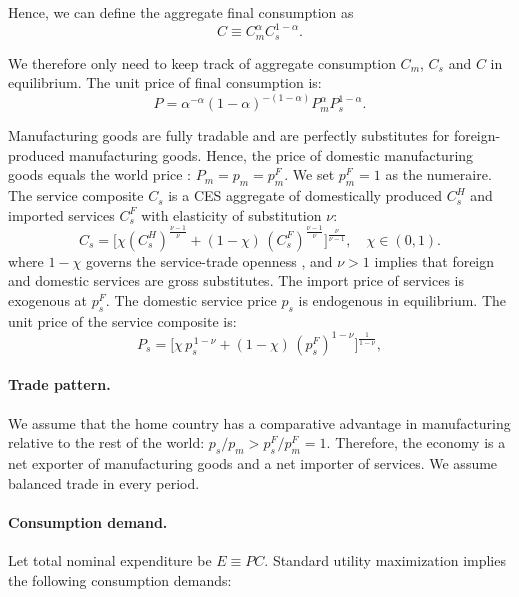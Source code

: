 \documentclass[12pt]{article} %
\theoremstyle{definition}
\begin{document}
Hence,  we can define the aggregate final consumption as 
\begin{equation}
    C \equiv  C_m^{\alpha} C_s^{1-\alpha}.
    \label{eq:finalC}
\end{equation}


We therefore only need to keep track of aggregate consumption  $C_m$, $C_s$ and $C$ in equilibrium.  The unit price of final consumption  is:  
\begin{equation}
    P =  \alpha^{-\alpha}(1-\alpha)^{-(1-\alpha)}  P_m^{\alpha}P_s^{1-\alpha}. \label{eq:P_index}
\end{equation}



Manufacturing goods are fully tradable and  are perfectly substitutes for foreign-produced manufacturing goods.  Hence, the price of domestic manufacturing goods equals the world price : $P_m=p_m=p^F_m$. We set $p^F_m = 1$ as the numeraire.  
The service composite $C_s$ is a CES aggregate of domestically produced $C_s^H$ and imported services $C_s^F$ with elasticity of substitution $\nu$:
\begin{equation}
C_s=\Big[\chi (C_s^H)^{\frac{\nu-1}{\nu}} + (1-\chi)\,(C_s^{F})^{\frac{\nu-1}{\nu}}\Big]^{\frac{\nu}{\nu-1}},
\quad \chi \in(0,1).
\label{eq:ces_services}
\end{equation}
 where $1-\chi$ governs the service-trade openness , and  $\nu>1$ implies that foreign and domestic services are gross substitutes.  The import price of services is exogenous at $p_s^F$. The domestic service price $p_s$ is endogenous in equilibrium.  The unit price of the service composite is:
\begin{equation}
P_s=\Big[\chi \,p_s^{\,1-\nu} + (1-\chi)\,(p_s^{F})^{1-\nu}\Big]^{\frac{1}{1-\nu}},
\label{eq:Ps_index}
\end{equation}
 
 \paragraph{Trade pattern.} We assume that the home country has a comparative advantage in manufacturing relative to the rest of the world: $p_s/p_m > p_s^F/p_m^F=1$. Therefore, the economy is a net exporter of manufacturing goods and a net importer of services. We assume balanced trade in every period. 

 \paragraph{Consumption demand.} Let total nominal expenditure be $E\equiv PC$. Standard utility maximization implies the following consumption demands:
\end{document}
